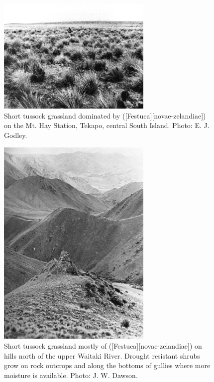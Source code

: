 \begin{figure}
	\includegraphics[width=0.66\textwidth]{graphics/fig_081}
	\centering
		\caption[Short tussock grassland dominated by fescue-tussock]{Short tussock grassland dominated by  ([Festuca][novae-zelandiae]) on the Mt. Hay Station, Tekapo, central South Island.
		Photo:  E. J. Godley.}%
		\label{fig:81short-tussock}
\end{figure}
\begin{figure}
	\includegraphics[width=0.66\textwidth]{graphics/fig_082}
	\centering
		\caption[Short tussock grassland mostly of \emph{Festuca novae-zelandiae}]{Short tussock grassland mostly of  ([Festuca][novae-zelandiae]) on hills north of the upper Waitaki River.
		Drought resistant shrubs grow on rock outcrops and along the bottoms of gullies where more moisture is available.  Photo:  J. W. Dawson.}%
		\label{fig:82short-tussock}
\end{figure}
